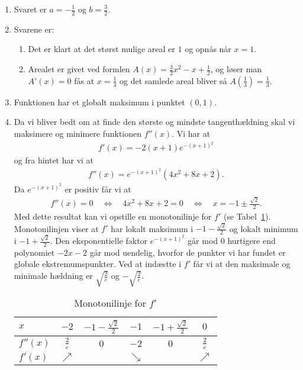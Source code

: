 \begin{enumerate}
	\item Svaret er $a=-\frac{1}{2}$ og $b=\frac{3}{2}$.
		
	\item \label{it:opt2ans} Svarene er:
	\begin{enumerate}
		\item Det er klart at det størst mulige areal er $1$ og opnås når $x=1$.
		\item Arealet er givet ved formlen $A(x)=\frac{3}{2}x^2-x+\frac{1}{2}$, og løser man $A'(x)=0$ fås at $x=\frac{1}{3}$ og det samlede areal bliver så $A(\frac{1}{3})=\frac{1}{3}$.
	\end{enumerate}
%	
	
	\item Funktionen har et globalt maksimum i punktet $(0,1)$.
	
	
	\item Da vi bliver bedt om at finde den største og mindste tangenthældning skal vi maksimere og minimere funktionen $f''(x)$. Vi har at
	\begin{align*}
	f'(x)=-2(x+1)e^{-(x+1)^2}
	\end{align*}
	og fra hintet har vi at
	\begin{align*}
	f''(x)=e^{-(x+1)^2}(4x^2+8x+2).
	\end{align*}
	Da $e^{-(x+1)^2}$ er positiv får vi at
	\begin{align*}
	f''(x)=0\quad \Leftrightarrow \quad 4x^2+8x+2=0 \quad \Leftrightarrow \quad x=-1\pm \frac{\sqrt{2}}{2}.
	\end{align*}
	Med dette resultat kan vi opstille en monotonilinje for $f'$ (se Tabel~\ref{fig:opt2}). Monotonilinjen viser at $f'$ har lokalt maksimum i $-1- \frac{\sqrt{2}}{2}$ og lokalt minimum i $-1+\frac{\sqrt{2}}{2}$. Den eksponentielle faktor $e^{-(x+1)^2}$ går mod $0$ hurtigere end polynomiet $-2x-2$ går mod uendelig, hvorfor de punkter vi har fundet er globale ekstremumspunkter. Ved at indæstte i $f'$ får vi at den maksimale og minimale hældning er $\sqrt{\frac{2}{e}}$ og $-\sqrt{\frac{2}{e}}$.
	\begin{table}[h!]
		\centering
		\begin{tabular}{@{}l  c c c c c@{}}
			$x$      & $-2$ 			 & $-1-\frac{\sqrt{2}}{2}$	& $-1$		& $-1+\frac{\sqrt{2}}{2}$	&$0$			\\ \toprule
			$f''(x)$  & $\frac{2}{e}$	 &     $0$ 		 			& $-2$		& $0$						&$\frac{2}{e}$	\\ \midrule
			$f'(x)$   & $\nearrow$&									& $\searrow$&							&$\nearrow$			\\ \bottomrule  
		\end{tabular}	
		\caption{Monotonilinje for $f'$}
		\label{fig:opt2}
\end{table}	
	

\end{enumerate}
